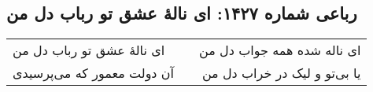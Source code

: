 \begin{center}
\section*{رباعی شماره ۱۴۲۷: ای نالهٔ عشق تو رباب دل من}
\label{sec:1427}
\begin{longtable}{l p{0.5cm} r}
ای نالهٔ عشق تو رباب دل من
&&
ای ناله شده همه جواب دل من
\\
آن دولت معمور که می‌پرسیدی
&&
یا بی‌تو و لیک در خراب دل من
\\
\end{longtable}
\end{center}
